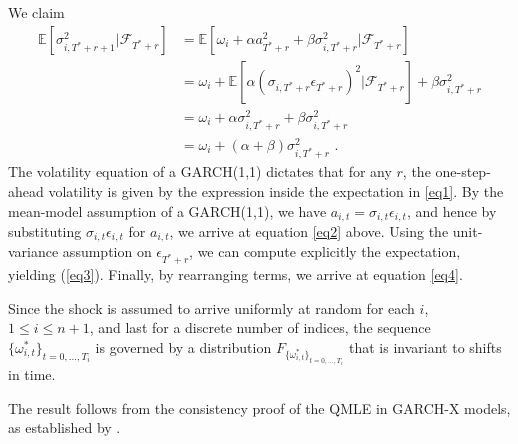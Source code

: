 \documentclass[11pt,3p,review,authoryear]{elsarticle}
\theoremstyle{definition}
\newenvironment{proof-of-proposition}[1][{}]{\noindent{\bf
    Proof of Proposition {#1}}
  \hspace*{.5em}}{\qed\bigskip\\}
\newenvironment{proof-of-lemma}[1][{}]{\noindent{\bf
Proof of Lemma {#1}}
\hspace*{.5em}}{\qed\bigskip\\}
\begin{document}
\begin{proof-of-proposition}[\ref{decay_prop}]
  We claim
  \begin{align}
  \mathbb{E}[ \sigma^{2}_{i,T^{*}+r+1} |\mathcal{F}_{T^{*}+r}] & = \mathbb{E}[\omega_{i} + \alpha a_{T^{*}+r}^{2} + \beta\sigma^{2}_{i,T^{*}+r} |\mathcal{F}_{T^{*}+r}] \label{eq1}\\
  & = \omega_{i} + \mathbb{E}[\alpha(\sigma_{i,T^{*}+r}\epsilon_{T^{*}+r})^{2} |\mathcal{F}_{T^{*}+r}] + \beta\sigma^{2}_{i,T^{*}+r} \label{eq2}\\
  & = \omega_{i} + \alpha\sigma_{i,T^{*}+r}^{2} + \beta\sigma^{2}_{i,T^{*}+r} \label{eq3}\\
  & = \omega_{i} + (\alpha + \beta) \sigma^{2}_{i,T^{*}+r}\label{eq4} \text{ .}
  \end{align}
  The volatility equation of a GARCH(1,1) dictates that for any $r$, the one-step-ahead volatility is given by the expression inside the expectation in \eqref{eq1}.  By the mean-model assumption of a GARCH(1,1), we have $a_{i,t} = \sigma_{i,t}\epsilon_{i,t}$, and hence by substituting $\sigma_{i,t}\epsilon_{i,t}$ for $a_{i,t}$, we arrive at equation \eqref{eq2} above.  Using the unit-variance assumption on $\epsilon_{T^{*}+r}$, we can compute explicitly the expectation, yielding (\ref{eq3}).  Finally, by rearranging terms, we arrive at equation \eqref{eq4}.
  \end{proof-of-proposition}

  \begin{proof-of-lemma}[\ref{lemma_ref}]
    Since the shock is assumed to arrive uniformly at random for each $i$, $1 \leq i \leq n + 1$, and last for a discrete number of indices, the sequence $\{\omega_{i,t}^{*}\}_{t=0,...,T_i}$ is governed by a distribution $F_{\{\omega_{i,t}^{*}\}_{t=0,...,T_i}}$ that is invariant to shifts in time.
    \end{proof-of-lemma}
    
    \begin{proof-of-proposition}[\ref{adjustment}]
    The result follows from the consistency proof of the QMLE in GARCH-X models, as established by \citet{han2014asymptotic}. 
    \end{proof-of-proposition}
\end{document}
